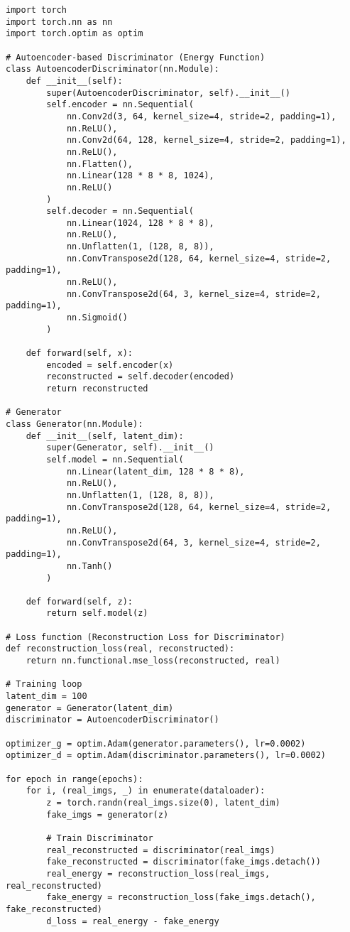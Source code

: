 \begin{lstlisting}[style=python]
import torch
import torch.nn as nn
import torch.optim as optim

# Autoencoder-based Discriminator (Energy Function)
class AutoencoderDiscriminator(nn.Module):
    def __init__(self):
        super(AutoencoderDiscriminator, self).__init__()
        self.encoder = nn.Sequential(
            nn.Conv2d(3, 64, kernel_size=4, stride=2, padding=1),
            nn.ReLU(),
            nn.Conv2d(64, 128, kernel_size=4, stride=2, padding=1),
            nn.ReLU(),
            nn.Flatten(),
            nn.Linear(128 * 8 * 8, 1024),
            nn.ReLU()
        )
        self.decoder = nn.Sequential(
            nn.Linear(1024, 128 * 8 * 8),
            nn.ReLU(),
            nn.Unflatten(1, (128, 8, 8)),
            nn.ConvTranspose2d(128, 64, kernel_size=4, stride=2, padding=1),
            nn.ReLU(),
            nn.ConvTranspose2d(64, 3, kernel_size=4, stride=2, padding=1),
            nn.Sigmoid()
        )
    
    def forward(self, x):
        encoded = self.encoder(x)
        reconstructed = self.decoder(encoded)
        return reconstructed

# Generator
class Generator(nn.Module):
    def __init__(self, latent_dim):
        super(Generator, self).__init__()
        self.model = nn.Sequential(
            nn.Linear(latent_dim, 128 * 8 * 8),
            nn.ReLU(),
            nn.Unflatten(1, (128, 8, 8)),
            nn.ConvTranspose2d(128, 64, kernel_size=4, stride=2, padding=1),
            nn.ReLU(),
            nn.ConvTranspose2d(64, 3, kernel_size=4, stride=2, padding=1),
            nn.Tanh()
        )
    
    def forward(self, z):
        return self.model(z)

# Loss function (Reconstruction Loss for Discriminator)
def reconstruction_loss(real, reconstructed):
    return nn.functional.mse_loss(reconstructed, real)

# Training loop
latent_dim = 100
generator = Generator(latent_dim)
discriminator = AutoencoderDiscriminator()

optimizer_g = optim.Adam(generator.parameters(), lr=0.0002)
optimizer_d = optim.Adam(discriminator.parameters(), lr=0.0002)

for epoch in range(epochs):
    for i, (real_imgs, _) in enumerate(dataloader):
        z = torch.randn(real_imgs.size(0), latent_dim)
        fake_imgs = generator(z)

        # Train Discriminator
        real_reconstructed = discriminator(real_imgs)
        fake_reconstructed = discriminator(fake_imgs.detach())
        real_energy = reconstruction_loss(real_imgs, real_reconstructed)
        fake_energy = reconstruction_loss(fake_imgs.detach(), fake_reconstructed)
        d_loss = real_energy - fake_energy


\end{lstlisting}
